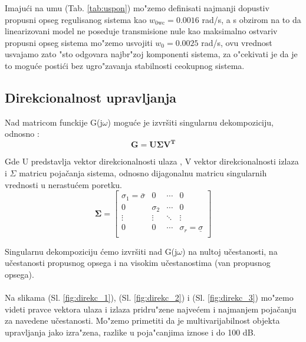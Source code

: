 \documentclass[a4paper,11pt]{article}
\theoremstyle{definition} \newtheorem{deff}{Definicija}[section]
\theoremstyle{definition} \newtheorem{prim}[deff]{Primer}
\theoremstyle{plain} \newtheorem{teor}[deff]{Teorema}
\begin{document}
	Imaju\'ci na umu (Tab. \ref{tab:uspon}) mo"zemo definisati najmanji dopustiv propusni opseg regulisanog sistema kao $w_{0\text{wc}} = 0.0016$ rad/s, a s obzirom na to da linearizovani model ne poseduje transmisione nule kao maksimalno ostvariv propusni opseg sistema mo"zemo usvojiti $w_0 = 0.0025$ rad/s, ovu vrednost usvajamo zato "sto odgovara najbr"zoj komponenti sistema, za o"cekivati je da je to mogu\'ce posti\'ci bez ugro"zavanja stabilnosti ceokupnog sistema. 
	
	
	
	
	\clearpage
	\subsection{Direkcionalnost upravljanja}
	
	Nad matricom funckije G(j$\omega$) moguće je izvršiti singularnu dekompoziciju, odnosno :
	\\
	
	\begin{equation}
		\mathbf{G = U\Sigma V^T}
	\end{equation}
	
	\noindent Gde U predstavlja vektor direkcionalnosti ulaza , V vektor direkcionalnosti izlaza  i $\Sigma$ matricu pojačanja sistema, odnosno dijagonalnu matricu singularnih vrednosti u nerastućem poretku. \\
	\begin{equation}
		\mathbf{\Sigma} = \begin{bmatrix}
			\sigma_1 = \bar{\sigma} & 0 & \cdots & 0 \\
			0 & \sigma_2 & \cdots & 0 \\
			\vdots & \vdots & \ddots & \vdots \\
			0 & 0 & \cdots & \sigma_r = \underline{\sigma} \\
		\end{bmatrix}
	\end{equation}
	
	\noindent Singularnu dekompoziciju ćemo izvršiti nad G(j$\omega$) na nultoj učestanosti, na učestanosti propusnog opsega i na visokim učestanostima (van propusnog opsega). \\\\
	
	Na slikama (Sl. \ref{fig:direkc_1}), (Sl. \ref{fig:direkc_2}) i (Sl. \ref{fig:direkc_3}) mo"zemo videti  pravce 
	vektora ulaza i izlaza pridru"zene najve\'cem i najmanjem pojačanju za navedene učestanosti. Mo"zemo primetiti da je multivarijabilnost objekta upravljanja jako izra"zena, razlike u poja"canjima iznose i do 100 dB.\\
	
\end{document}
